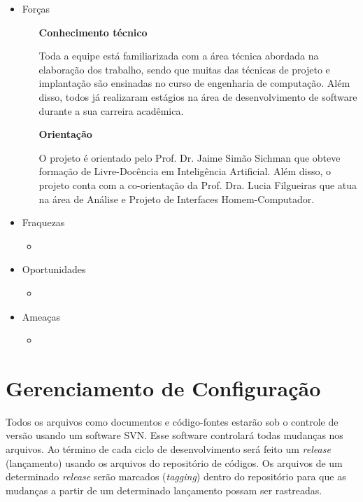 \documentclass[]{article}
\begin{document}
\begin{itemize}
  \item Forças
  \begin{itemize}
    \item[\textbf{Conhecimento técnico}]
    
     Toda a equipe está familiarizada com a área técnica abordada na elaboração dos trabalho, sendo que muitas das técnicas de projeto e implantação são ensinadas no curso de engenharia de computação. Além disso, todos já realizaram estágios na área de desenvolvimento de software durante a sua carreira acadêmica.
    
    \item[\textbf{Orientação}] 
    
     O projeto é orientado pelo Prof. Dr. Jaime Simão Sichman que obteve formação de Livre-Docência em Inteligência Artificial. Além disso, o projeto conta com a co-orientação da Prof. Dra. Lucia Filgueiras que atua na área de Análise e Projeto de Interfaces Homem-Computador.
     
  \end{itemize}
  
  \item Fraquezas
  \begin{itemize}
    \item 
  \end{itemize}
  
  \item Oportunidades
  \begin{itemize}
    \item 
  \end{itemize}
  
  \item Ameaças
  \begin{itemize}
    \item 
  \end{itemize}
\end{itemize}



\section{Gerenciamento de Configuração} %
\label{sec:gerenciamento_de_configuracao}

Todos os arquivos como documentos e código-fontes estarão sob o controle de versão usando um software SVN. Esse software controlará todas mudanças nos arquivos. Ao término de cada ciclo de desenvolvimento será feito um \emph{release} (lançamento) usando os arquivos do repositório de códigos. Os arquivos de um determinado \emph{release} serão marcados (\emph{tagging}) dentro do repositório para que as mudanças a partir de um determinado lançamento possam ser rastreadas.
\end{document}

